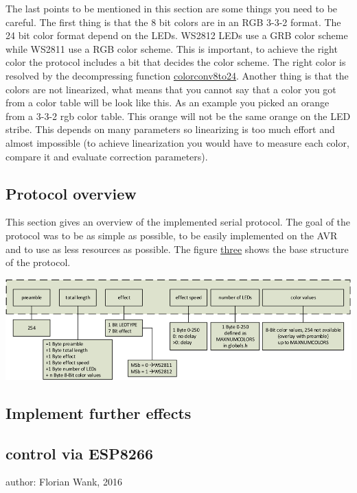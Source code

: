  The last points to be mentioned in this section are some things you need to be careful. The first thing is that the 8 bit colors are in an R\+G\+B 3-\/3-\/2 format. The 24 bit color format depend on the L\+E\+Ds. W\+S2812 L\+E\+Ds use a G\+R\+B color scheme while W\+S2811 use a R\+G\+B color scheme. This is important, to achieve the right color the protocol includes a bit that decides the color scheme. The right color is resolved by the decompressing function \hyperlink{_led_effects_8h_a55291315ab0f2ca8d508f0e9da1920a7}{colorconv8to24}. Another thing is that the colors are not linearized, what means that you cannot say that a color you got from a color table will be look like this. As an example you picked an orange from a 3-\/3-\/2 rgb color table. This orange will not be the same orange on the L\+E\+D stribe. This depends on many parameters so linearizing is too much effort and almost impossible (to achieve linearization you would have to measure each color, compare it and evaluate correction parameters).\hypertarget{index_protocol_sec}{}\subsection{Protocol overview}\label{index_protocol_sec}
This section gives an overview of the implemented serial protocol. The goal of the protocol was to be as simple as possible, to be easily implemented on the A\+V\+R and to use as less resources as possible. The figure \hyperlink{index_three}{three} shows the base structure of the protocol. \label{index_three}%
\hypertarget{index_three}{}%
  
\begin{DoxyImage}
\includegraphics[width=\textwidth,height=\textheight/2,keepaspectratio=true]{Protoll_V1_2_engl.png}
\caption{W\+S2812 stribe with pin header}
\end{DoxyImage}
 \hypertarget{index_owneffects_sec}{}\subsection{Implement further effects}\label{index_owneffects_sec}
\hypertarget{index_esp_sec}{}\subsection{control via E\+S\+P8266}\label{index_esp_sec}
author\+: Florian Wank, 2016 